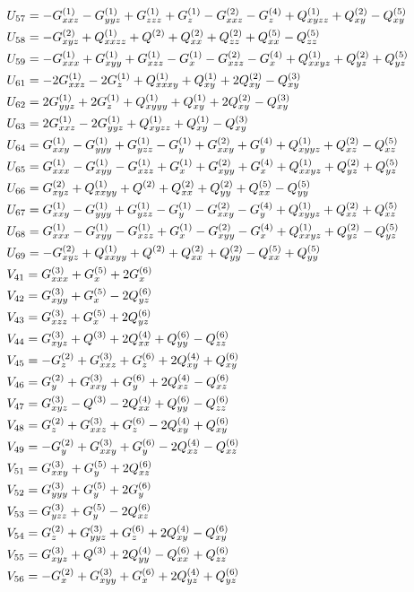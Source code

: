 \documentclass[11pt]{easymemo}
\begin{document}
\begin{align}
\cr&
U_{57}=-G^{(1)}_{xxz} - G^{(1)}_{yyz} + G^{(1)}_{zzz} + G^{(1)}_{z} - G^{(2)}_{xxz} - G^{(4)}_{z} + Q^{(1)}_{xyzz} + Q^{(2)}_{xy} - Q^{(5)}_{xy}
\cr&
U_{58}=-G^{(2)}_{xyz} + Q^{(1)}_{xxzz} + Q^{(2)} + Q^{(2)}_{xx} + Q^{(2)}_{zz} + Q^{(5)}_{xx} - Q^{(5)}_{zz}
\cr&
U_{59}=-G^{(1)}_{xxx} + G^{(1)}_{xyy} + G^{(1)}_{xzz} - G^{(1)}_{x} - G^{(2)}_{xzz} - G^{(4)}_{x} + Q^{(1)}_{xxyz} + Q^{(2)}_{yz} + Q^{(5)}_{yz}
\cr&
U_{61}=-2G^{(1)}_{xxz} - 2G^{(1)}_{z} + Q^{(1)}_{xxxy} + Q^{(1)}_{xy} + 2Q^{(2)}_{xy} - Q^{(3)}_{xy}
\cr&
U_{62}=2G^{(1)}_{yyz} + 2G^{(1)}_{z} + Q^{(1)}_{xyyy} + Q^{(1)}_{xy} + 2Q^{(2)}_{xy} - Q^{(3)}_{xy}
\cr&
U_{63}=2G^{(1)}_{xxz} - 2G^{(1)}_{yyz} + Q^{(1)}_{xyzz} + Q^{(1)}_{xy} - Q^{(3)}_{xy}
\cr&
U_{64}=G^{(1)}_{xxy} - G^{(1)}_{yyy} + G^{(1)}_{yzz} - G^{(1)}_{y} + G^{(2)}_{xxy} + G^{(4)}_{y} + Q^{(1)}_{xyyz} + Q^{(2)}_{xz} - Q^{(5)}_{xz}
\cr&
U_{65}=G^{(1)}_{xxx} - G^{(1)}_{xyy} - G^{(1)}_{xzz} + G^{(1)}_{x} + G^{(2)}_{xyy} + G^{(4)}_{x} + Q^{(1)}_{xxyz} + Q^{(2)}_{yz} + Q^{(5)}_{yz}
\cr&
U_{66}=G^{(2)}_{xyz} + Q^{(1)}_{xxyy} + Q^{(2)} + Q^{(2)}_{xx} + Q^{(2)}_{yy} + Q^{(5)}_{xx} - Q^{(5)}_{yy}
\cr&
U_{67}=G^{(1)}_{xxy} - G^{(1)}_{yyy} + G^{(1)}_{yzz} - G^{(1)}_{y} - G^{(2)}_{xxy} - G^{(4)}_{y} + Q^{(1)}_{xyyz} + Q^{(2)}_{xz} + Q^{(5)}_{xz}
\cr&
U_{68}=G^{(1)}_{xxx} - G^{(1)}_{xyy} - G^{(1)}_{xzz} + G^{(1)}_{x} - G^{(2)}_{xyy} - G^{(4)}_{x} + Q^{(1)}_{xxyz} + Q^{(2)}_{yz} - Q^{(5)}_{yz}
\cr&
U_{69}=-G^{(2)}_{xyz} + Q^{(1)}_{xxyy} + Q^{(2)} + Q^{(2)}_{xx} + Q^{(2)}_{yy} - Q^{(5)}_{xx} + Q^{(5)}_{yy}
\\&
V_{41}=G^{(3)}_{xxx} + G^{(5)}_{x} + 2G^{(6)}_{x}
\cr&
V_{42}=G^{(3)}_{xyy} + G^{(5)}_{x} - 2Q^{(6)}_{yz}
\cr&
V_{43}=G^{(3)}_{xzz} + G^{(5)}_{x} + 2Q^{(6)}_{yz}
\cr&
V_{44}=G^{(3)}_{xyz} + Q^{(3)} + 2Q^{(4)}_{xx} + Q^{(6)}_{yy} - Q^{(6)}_{zz}
\cr&
V_{45}=-G^{(2)}_{z} + G^{(3)}_{xxz} + G^{(6)}_{z} + 2Q^{(4)}_{xy} + Q^{(6)}_{xy}
\cr&
V_{46}=G^{(2)}_{y} + G^{(3)}_{xxy} + G^{(6)}_{y} + 2Q^{(4)}_{xz} - Q^{(6)}_{xz}
\cr&
V_{47}=G^{(3)}_{xyz} - Q^{(3)} - 2Q^{(4)}_{xx} + Q^{(6)}_{yy} - Q^{(6)}_{zz}
\cr&
V_{48}=G^{(2)}_{z} + G^{(3)}_{xxz} + G^{(6)}_{z} - 2Q^{(4)}_{xy} + Q^{(6)}_{xy}
\cr&
V_{49}=-G^{(2)}_{y} + G^{(3)}_{xxy} + G^{(6)}_{y} - 2Q^{(4)}_{xz} - Q^{(6)}_{xz}
\cr&
V_{51}=G^{(3)}_{xxy} + G^{(5)}_{y} + 2Q^{(6)}_{xz}
\cr&
V_{52}=G^{(3)}_{yyy} + G^{(5)}_{y} + 2G^{(6)}_{y}
\cr&
V_{53}=G^{(3)}_{yzz} + G^{(5)}_{y} - 2Q^{(6)}_{xz}
\cr&
V_{54}=G^{(2)}_{z} + G^{(3)}_{yyz} + G^{(6)}_{z} + 2Q^{(4)}_{xy} - Q^{(6)}_{xy}
\cr&
V_{55}=G^{(3)}_{xyz} + Q^{(3)} + 2Q^{(4)}_{yy} - Q^{(6)}_{xx} + Q^{(6)}_{zz}
\cr&
V_{56}=-G^{(2)}_{x} + G^{(3)}_{xyy} + G^{(6)}_{x} + 2Q^{(4)}_{yz} + Q^{(6)}_{yz}

\end{align}
\end{document}
